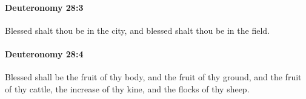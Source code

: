 		\paragraph{Deuteronomy 28:3} %
			\label{DEUTERONOMY-28-3}

			Blessed shalt thou be in the city, and blessed shalt thou be in the field.


		\paragraph{Deuteronomy 28:4} %
			\label{DEUTERONOMY-28-4}

			Blessed shall be the fruit of thy body, and the fruit of thy ground, and the fruit of thy cattle, the increase of thy kine, and the flocks of thy sheep.


